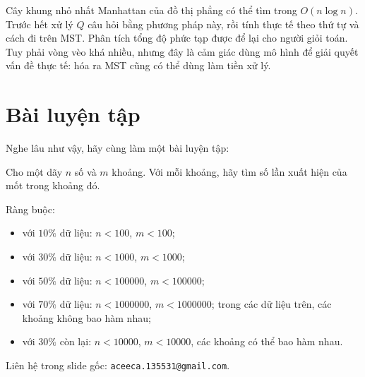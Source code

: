 \documentclass[11pt]{article}
\begin{document}
Cây khung nhỏ nhất Manhattan của đồ thị phẳng có thể tìm trong $O(n\log n)$.
Trước hết xử lý $Q$ câu hỏi bằng phương pháp này, rồi tính thực tế theo thứ tự
và cách đi trên MST.  Phân tích tổng độ phức tạp được để lại cho người giỏi
toán.  Tuy phải vòng vèo khá nhiều, nhưng đây là cảm giác dùng mô hình để giải
quyết vấn đề thực tế: hóa ra MST cũng có thể dùng làm tiền xử lý.

\section{Bài luyện tập}

Nghe lâu như vậy, hãy cùng làm một bài luyện tập:

Cho một dãy $n$ số và $m$ khoảng.  Với mỗi khoảng, hãy tìm số lần xuất hiện của
mốt trong khoảng đó.

Ràng buộc:
\begin{itemize}
  \item với $10\%$ dữ liệu: $n<100$, $m<100$;
  \item với $30\%$ dữ liệu: $n<1000$, $m<1000$;
  \item với $50\%$ dữ liệu: $n<100000$, $m<100000$;
  \item với $70\%$ dữ liệu: $n<1000000$, $m<1000000$; trong các dữ liệu trên,
  các khoảng không bao hàm nhau;
  \item với $30\%$ còn lại: $n<10000$, $m<10000$, các khoảng có thể bao hàm
  nhau.
\end{itemize}

Liên hệ trong slide gốc: \texttt{aceeca.135531@gmail.com}.
\end{document}
